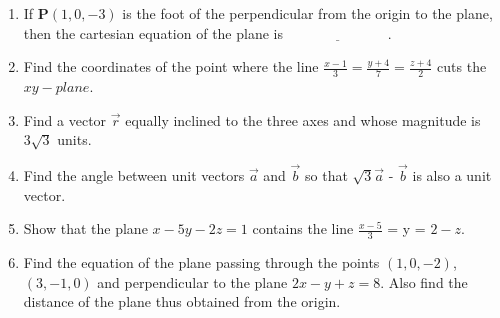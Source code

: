 \documentclass[12pt,-letter paper]{article}
\let\vec\mathbf{}
\let\vec\mathbf{}
\providecommand{\brak}[1]{\ensuremath{\left(#1\right)}}
\begin{document}
\begin{enumerate}
\item If $\vec{P}\brak{1,  0, -3}$ is the foot of the perpendicular from the origin to the plane, then the cartesian equation of the plane is $\underline{\hspace{3cm}}$.
\item Find the coordinates of the point where the line $\frac{x-1}{3} = \frac{y+4}{7} = \frac{z+4}{2}$ cuts the $xy-plane$.
\item Find a vector $\overrightarrow{r}$ equally inclined to the three axes and whose magnitude is $3\sqrt{3}$ units.
\item Find the angle between unit vectors $\overrightarrow{a}$ and $\overrightarrow{b}$ so that $\sqrt{3}\overrightarrow{a}$ - $\overrightarrow{b}$ is also a unit vector.
\item Show that the plane $x - 5y - 2z = 1$ contains the line $\frac{x - 5}{3}$ = y = $2 -z$.
\item Find the equation of the plane passing through the points $\brak{1, 0, -2}$,  $\brak{3, -1, 0}$ and perpendicular to the plane $2x - y + z = 8$. Also find the distance of the plane thus obtained from the origin.
\end{enumerate}
\end{document}
